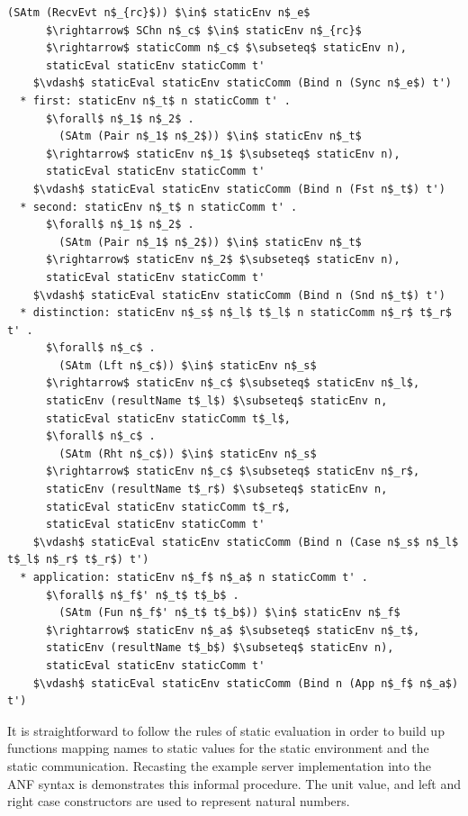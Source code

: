 \documentclass[letterpaper, 11pt]{extarticle}
\begin{document}
\begin{lstlisting}[language=logic, mathescape]
        (SAtm (RecvEvt n$_{rc}$)) $\in$ staticEnv n$_e$
      $\rightarrow$ SChn n$_c$ $\in$ staticEnv n$_{rc}$ 
      $\rightarrow$ staticComm n$_c$ $\subseteq$ staticEnv n),
      staticEval staticEnv staticComm t'
    $\vdash$ staticEval staticEnv staticComm (Bind n (Sync n$_e$) t')
  * first: staticEnv n$_t$ n staticComm t' . 
      $\forall$ n$_1$ n$_2$ .
        (SAtm (Pair n$_1$ n$_2$)) $\in$ staticEnv n$_t$
      $\rightarrow$ staticEnv n$_1$ $\subseteq$ staticEnv n),
      staticEval staticEnv staticComm t'
    $\vdash$ staticEval staticEnv staticComm (Bind n (Fst n$_t$) t')
  * second: staticEnv n$_t$ n staticComm t' . 
      $\forall$ n$_1$ n$_2$ . 
        (SAtm (Pair n$_1$ n$_2$)) $\in$ staticEnv n$_t$
      $\rightarrow$ staticEnv n$_2$ $\subseteq$ staticEnv n),
      staticEval staticEnv staticComm t'
    $\vdash$ staticEval staticEnv staticComm (Bind n (Snd n$_t$) t')
  * distinction: staticEnv n$_s$ n$_l$ t$_l$ n staticComm n$_r$ t$_r$ t' . 
      $\forall$ n$_c$ . 
        (SAtm (Lft n$_c$)) $\in$ staticEnv n$_s$
      $\rightarrow$ staticEnv n$_c$ $\subseteq$ staticEnv n$_l$,
      staticEnv (resultName t$_l$) $\subseteq$ staticEnv n,
      staticEval staticEnv staticComm t$_l$,
      $\forall$ n$_c$ . 
        (SAtm (Rht n$_c$)) $\in$ staticEnv n$_s$
      $\rightarrow$ staticEnv n$_c$ $\subseteq$ staticEnv n$_r$, 
      staticEnv (resultName t$_r$) $\subseteq$ staticEnv n, 
      staticEval staticEnv staticComm t$_r$,
      staticEval staticEnv staticComm t'
    $\vdash$ staticEval staticEnv staticComm (Bind n (Case n$_s$ n$_l$ t$_l$ n$_r$ t$_r$) t')
  * application: staticEnv n$_f$ n$_a$ n staticComm t' . 
      $\forall$ n$_f$' n$_t$ t$_b$ . 
        (SAtm (Fun n$_f$' n$_t$ t$_b$)) $\in$ staticEnv n$_f$
      $\rightarrow$ staticEnv n$_a$ $\subseteq$ staticEnv n$_t$, 
      staticEnv (resultName t$_b$) $\subseteq$ staticEnv n),
      staticEval staticEnv staticComm t'
    $\vdash$ staticEval staticEnv staticComm (Bind n (App n$_f$ n$_a$) t')
\end{lstlisting}

It is straightforward to follow the rules of static evaluation in order to build up
functions mapping names to static values for the static environment
and the static communication.
Recasting the example server implementation into the ANF syntax is demonstrates this informal procedure.
The unit value, and left and right case constructors are used to represent natural numbers.
\end{document}
